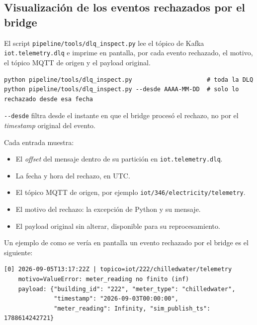\subsection{Visualización de los eventos rechazados por el bridge}

El script \texttt{pipeline/tools/dlq\_inspect.py} lee el tópico de Kafka \texttt{iot.telemetry.dlq} e imprime en pantalla, por cada evento rechazado, el motivo, el tópico MQTT de origen y el payload original.

{\footnotesize
\begin{verbatim}
python pipeline/tools/dlq_inspect.py                     # toda la DLQ
python pipeline/tools/dlq_inspect.py --desde AAAA-MM-DD  # solo lo rechazado desde esa fecha
\end{verbatim}
}

\texttt{-{}-desde} filtra desde el instante en que el bridge procesó el rechazo, no por el \textit{timestamp} original del evento.

Cada entrada muestra:

\begin{itemize}
  \item El \textit{offset} del mensaje dentro de su partición en \texttt{iot.telemetry.dlq}.
  \item La fecha y hora del rechazo, en UTC.
  \item El tópico MQTT de origen, por ejemplo \texttt{iot/346/electricity/telemetry}.
  \item El motivo del rechazo: la excepción de Python y su mensaje.
  \item El payload original sin alterar, disponible para su reprocesamiento.
\end{itemize}

Un ejemplo de como se vería en pantalla un evento rechazado por el bridge es el siguiente:

{\footnotesize
\begin{verbatim}
[0] 2026-09-05T13:17:22Z | topico=iot/222/chilledwater/telemetry
    motivo=ValueError: meter_reading no finito (inf)
    payload: {"building_id": "222", "meter_type": "chilledwater",
              "timestamp": "2026-09-03T00:00:00",
              "meter_reading": Infinity, "sim_publish_ts": 1788614242721}
\end{verbatim}
}
